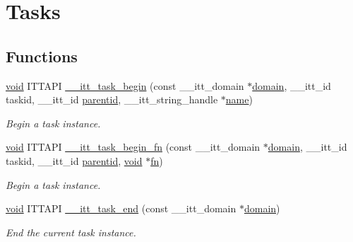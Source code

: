 \hypertarget{group__tasks}{\section{Tasks}
\label{group__tasks}
}
\subsection*{Functions}
\begin{DoxyCompactItemize}
\item 
\hyperlink{ittnotify__static_8h_af941d56e55e3c5465135b60c4d6343ed}{void} I\-T\-T\-A\-P\-I \hyperlink{group__tasks_ga2560be40a32fb564081db7197cca4e1b}{\-\_\-\-\_\-itt\-\_\-task\-\_\-begin} (const \-\_\-\-\_\-itt\-\_\-domain $\ast$\hyperlink{ittnotify__static_8h_ae4bc3459cfd348603d57d87ede15591b}{domain}, \-\_\-\-\_\-itt\-\_\-id taskid, \-\_\-\-\_\-itt\-\_\-id \hyperlink{ittnotify__static_8h_a7684cd9b2177694edfeedb60071eba61}{parentid}, \-\_\-\-\_\-itt\-\_\-string\-\_\-handle $\ast$\hyperlink{ittnotify__static_8h_a1c34b35a4952969fef60192313bba34a}{name})
\begin{DoxyCompactList}\small\item\em Begin a task instance. \end{DoxyCompactList}\item 
\hyperlink{ittnotify__static_8h_af941d56e55e3c5465135b60c4d6343ed}{void} I\-T\-T\-A\-P\-I \hyperlink{group__tasks_gaa1cb092474a9aff3d6cba7b4aebb2760}{\-\_\-\-\_\-itt\-\_\-task\-\_\-begin\-\_\-fn} (const \-\_\-\-\_\-itt\-\_\-domain $\ast$\hyperlink{ittnotify__static_8h_ae4bc3459cfd348603d57d87ede15591b}{domain}, \-\_\-\-\_\-itt\-\_\-id taskid, \-\_\-\-\_\-itt\-\_\-id \hyperlink{ittnotify__static_8h_a7684cd9b2177694edfeedb60071eba61}{parentid}, \hyperlink{ittnotify__static_8h_af941d56e55e3c5465135b60c4d6343ed}{void} $\ast$\hyperlink{ittnotify__static_8h_a4da9f78418848eb6658704b4e8aa4aa7}{fn})
\begin{DoxyCompactList}\small\item\em Begin a task instance. \end{DoxyCompactList}\item 
\hyperlink{ittnotify__static_8h_af941d56e55e3c5465135b60c4d6343ed}{void} I\-T\-T\-A\-P\-I \hyperlink{group__tasks_ga087423f93ad4646ff5207e7851d6fa61}{\-\_\-\-\_\-itt\-\_\-task\-\_\-end} (const \-\_\-\-\_\-itt\-\_\-domain $\ast$\hyperlink{ittnotify__static_8h_ae4bc3459cfd348603d57d87ede15591b}{domain})
\begin{DoxyCompactList}\small\item\em End the current task instance. \end{DoxyCompactList}\end{DoxyCompactItemize}


